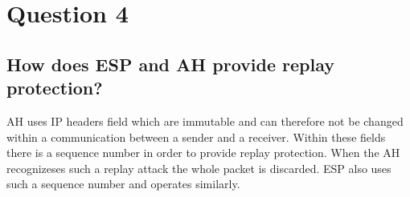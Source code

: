 \documentclass{report}
\begin{document}
	\section{Question 4}
	\startsection
		\renewcommand{\thesubsection}{\thesection.\Alph{subsection}}
		\subsection{How does ESP and AH provide replay protection?}
		\startsubsection
			AH uses IP headers field which are immutable and can therefore not be changed within a communication between a sender and a receiver. Within these fields there is a sequence number in order to provide replay protection. When the AH recognizeses such a replay attack the whole packet is discarded. ESP also uses such a sequence number and operates similarly.
		\closesection
	\closesection
\end{document}
